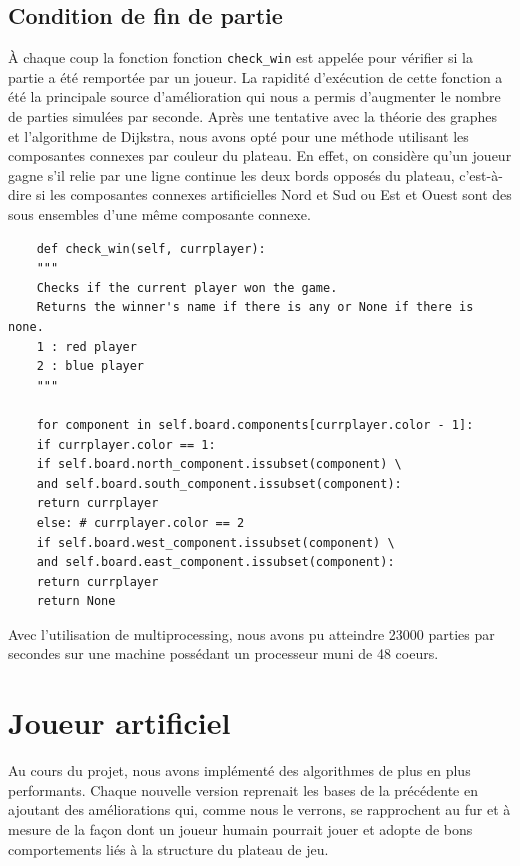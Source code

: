 \documentclass[a4paper]{article}
\theoremstyle{definition}
\begin{document}
\subsection{Condition de fin de partie}

À chaque coup la fonction fonction \texttt{check\_win} est appelée pour vérifier si la partie a été remportée par un joueur. La rapidité d'exécution de cette fonction a été la principale source d'amélioration qui nous a permis d'augmenter le nombre de parties simulées par seconde. Après une tentative avec la théorie des graphes et l'algorithme de Dijkstra, nous avons opté pour une méthode utilisant les composantes connexes par couleur du plateau. En effet, on considère qu'un joueur gagne s'il relie par une ligne continue les deux bords opposés du plateau, c'est-à-dire si les composantes connexes artificielles Nord et Sud ou Est et Ouest sont des sous ensembles d'une même composante connexe.

\begin{lstlisting}
	def check_win(self, currplayer):
	"""
	Checks if the current player won the game. 
	Returns the winner's name if there is any or None if there is none.
	1 : red player
	2 : blue player
	"""
	
	for component in self.board.components[currplayer.color - 1]:
	if currplayer.color == 1:
	if self.board.north_component.issubset(component) \
	and self.board.south_component.issubset(component):
	return currplayer
	else: # currplayer.color == 2
	if self.board.west_component.issubset(component) \
	and self.board.east_component.issubset(component):
	return currplayer
	return None
\end{lstlisting}

Avec l'utilisation de multiprocessing, nous avons pu atteindre 23000 parties par secondes sur une machine possédant un processeur muni de 48 coeurs.

\newpage


\section{Joueur artificiel}

Au cours du projet, nous avons implémenté des algorithmes de plus en plus performants. Chaque nouvelle version reprenait les bases de la précédente en ajoutant des améliorations qui, comme nous le verrons, se rapprochent au fur et à mesure de la façon dont un joueur humain pourrait jouer et adopte de bons comportements liés à la structure du plateau de jeu.
\end{document}
